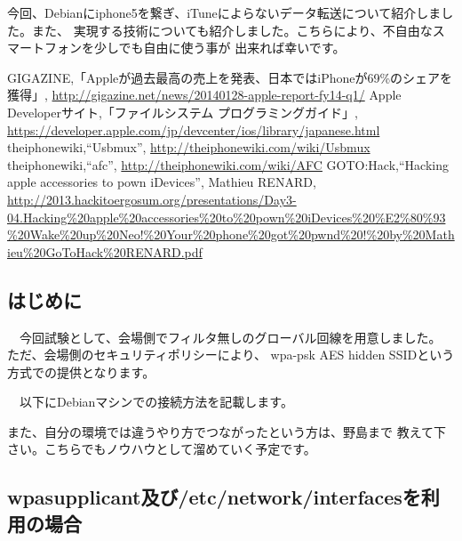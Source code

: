 \documentclass[mingoth,a4paper]{jsarticle}
\begin{document}
 今回、Debianにiphone5を繋ぎ、iTuneによらないデータ転送について紹介しました。また、
実現する技術についても紹介しました。こちらにより、不自由なスマートフォンを少しでも自由に使う事が
出来れば幸いです。

\begin{thebibliography}{0}
    {\footnotesize{
       GIGAZINE,「Appleが過去最高の売上を発表、日本ではiPhoneが69\%のシェアを獲得」,
       \url{http://gigazine.net/news/20140128-apple-report-fy14-q1/}}}
    {\footnotesize{
       Apple Developerサイト,「ファイルシステム プログラミングガイド」,
       \url{https://developer.apple.com/jp/devcenter/ios/library/japanese.html}}}
    {\footnotesize{
       theiphonewiki,``Usbmux'',
       \url{http://theiphonewiki.com/wiki/Usbmux}}}
    {\footnotesize{
       theiphonewiki,``afc'',
       \url{http://theiphonewiki.com/wiki/AFC}}}
    {\footnotesize{
       GOTO:Hack,``Hacking apple accessories to pown iDevices'', Mathieu RENARD,
       \url{http://2013.hackitoergosum.org/presentations/Day3-04.Hacking%20apple%20accessories%20to%20pown%20iDevices%20%E2%80%93%20Wake%20up%20Neo!%20Your%20phone%20got%20pwnd%20!%20by%20Mathieu%20GoToHack%20RENARD.pdf}}}
\end{thebibliography}


 \subsection{はじめに}

　今回試験として、会場側でフィルタ無しのグローバル回線を用意しました。
ただ、会場側のセキュリティポリシーにより、
wpa-psk AES hidden SSIDという方式での提供となります。

　以下にDebianマシンでの接続方法を記載します。

 また、自分の環境では違うやり方でつながったという方は、野島まで
教えて下さい。こちらでもノウハウとして溜めていく予定です。

 \subsection{wpasupplicant及び/etc/network/interfacesを利用の場合}
\end{document}
